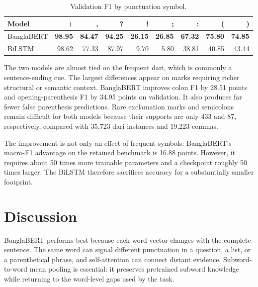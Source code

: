 \documentclass[11pt,a4paper]{article}
\newcommand{\bn}[1]{{\banglafont #1}}
\begin{document}
\begin{table}[h]
\centering
\caption{Validation F1 by punctuation symbol.}
\small
\begin{tabular}{@{}lrrrrrrrr@{}}
\toprule
\textbf{Model} & \bn{।} & \textbf{,} & \textbf{?} & \textbf{!} & \textbf{;} & \textbf{:} & \textbf{(} & \textbf{)} \\
\midrule
BanglaBERT & \textbf{98.95} & \textbf{84.47} & \textbf{94.25} & \textbf{26.15} & \textbf{26.85} & \textbf{67.32} & \textbf{75.80} & \textbf{74.85} \\
BiLSTM & 98.62 & 77.33 & 87.97 & 9.70 & 5.80 & 38.81 & 40.85 & 43.44 \\
\bottomrule
\end{tabular}
\end{table}

The two models are almost tied on the frequent dari, which is commonly a sentence-ending cue. The largest differences appear on marks requiring richer structural or semantic context. BanglaBERT improves colon F1 by 28.51 points and opening-parenthesis F1 by 34.95 points on validation. It also produces far fewer false parenthesis predictions. Rare exclamation marks and semicolons remain difficult for both models because their supports are only 433 and 87, respectively, compared with 35,723 dari instances and 19,223 commas.

The improvement is not only an effect of frequent symbols: BanglaBERT's macro-F1 advantage on the retained benchmark is 16.88 points. However, it requires about 50 times more trainable parameters and a checkpoint roughly 50 times larger. The BiLSTM therefore sacrifices accuracy for a substantially smaller footprint.

\clearpage

\section{Discussion}
BanglaBERT performs best because each word vector changes with the complete sentence. The same word can signal different punctuation in a question, a list, or a parenthetical phrase, and self-attention can connect distant evidence. Subword-to-word mean pooling is essential: it preserves pretrained subword knowledge while returning to the word-level gaps used by the task.
\end{document}
